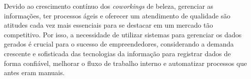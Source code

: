 Devido ao crescimento contínuo dos \emph{coworkings} de beleza, gerenciar as informações, ter processos ágeis e oferecer um atendimento de qualidade são atitudes cada vez mais essenciais para se destacar em um mercado tão competitivo. Por isso, a necessidade de utilizar sistemas para gerenciar os dados gerados é crucial para o sucesso de empreendedores, considerando  a demanda crescente e sofisticada das tecnologias da informação para registrar dados de forma confiável, melhorar o fluxo de trabalho interno e automatizar processos que antes eram manuais.



	

%

